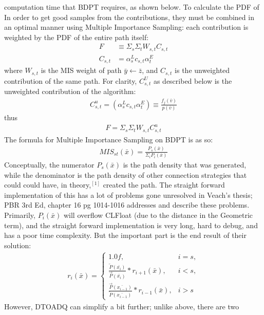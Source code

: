 \message{ !name(test.tex)}\documentclass{article}
\begin{document}
computation time that BDPT requires, as shown below. To calculate the PDF of In
order to get good samples from the contributions, they must be combined in an
optimal manner using Multiple Importance Sampling: each contribution is weighted
by the PDF of the entire path itself:
  \begin{align*}
    F &\equiv \Sigma_s\Sigma_tW_{s, t}C_{s, t}\\
    C_{s, t} &= \alpha^L_s c_{s, t} \alpha^E_t
  \end{align*}
    where $W_{s, t}$ is the MIS weight of path $\bar{y} \leftarrow \bar{z}$, and
$C_{s, t}$ is the unweighted contribution of the same path. For clarity,
$C^U_{s, t}$ as described below is the unweighted contribution of the
    algorithm:
  \begin{align}
    C^u_{s, t} = (\alpha^L_s c_{s, t} \alpha^E_t) \equiv
    \frac{f_j(\bar{v})}{p(\bar{v})}
  \end{align}
  thus
  \begin{align}
    F = \Sigma_s\Sigma_tW_{s, t}C^u_{s, t}
  \end{align}
    The formula for Multiple Importance Sampling on BDPT is as so:
  \begin{align}
    MIS_{st}(\bar{x}) = \frac{P_s(\bar{x})}{\Sigma_i{P_i(\bar{x})}} 
  \end{align}
    Conceptually, the numerator $P_s(\bar{x})$ is the path density that was
generated, while the denominator is the path density of other connection
strategies that could could have, in theory,$^{[1]}$ created the path. The
straight forward implementation of this has a lot of problems gone unresolved in
Veach's thesis; PBR 3rd Ed, chapter 16 pg 1014-1016 addresses and describe these
problems. Primarily, $P_i(\bar{x})$ will overflow CLFloat (due to the distance
in the Geometric term), and the straight forward implementation is very long,
hard to debug, and has a poor time complexity. But the important part is the end
result of their solution:
  \begin{align}
    r_i (\bar{x}) = 
    \begin{cases}
      1.0f, & i = s,\\
      \frac{\overleftarrow{P}(\bar{x_i})}{\overrightarrow{P}(\bar{x_i})} *
      r_{i+1}(\bar{x}), & i < s,\\
      \frac{\overrightarrow{P}(\bar{x_{i-1}})}{\overleftarrow{P}(\bar{x_{i-1}})}
      * r_{i-1}(\bar{x}), & i > s
    \end{cases}
  \end{align}
    However, DTOADQ can simplify a bit further; unlike above, there are two
\end{document}
